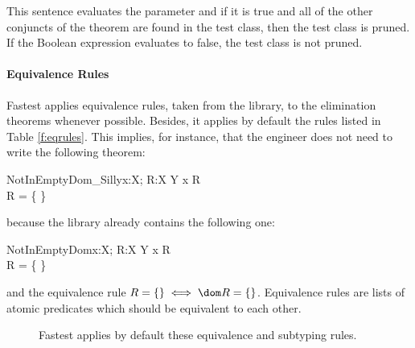 This sentence evaluates the parameter and if it is true and all of the other conjuncts of the theorem are found in the test class, then the test class is pruned. If the Boolean expression evaluates to false, the test class is not pruned. 

\paragraph{Equivalence Rules} Fastest applies equivalence rules, taken from the library, to the elimination theorems whenever possible. Besides, it applies by default the rules listed in Table \ref{f:eqrules}. This implies, for instance, that the engineer does not need to write the following theorem:

\begin{theorem}{NotInEmptyDom\_Silly}{x:X; R:X \rel Y}
 x \in \dom R \\
\dom R = \{ \}
\end{theorem}

\noindent because the library already contains the following one:

\begin{theorem}{NotInEmptyDom}{x:X; R:X \rel Y}
 x \in \dom R \\
 R = \{ \}
\end{theorem}

\noindent and the equivalence rule $R = \{ \} \iff \dom R = \{ \}$. Equivalence rules are lists of atomic predicates which should be equivalent to each other.

\begin{figure}
\centering
{} \hspace{1cm}
\caption{Fastest applies by default these equivalence and subtyping rules.}
\end{figure}

